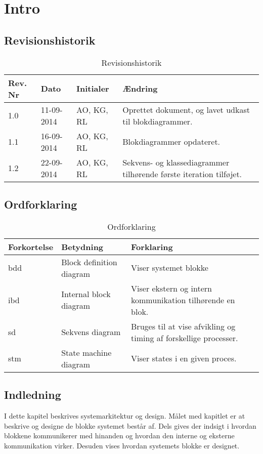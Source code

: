 \chapter{Intro}

\section{Revisionshistorik}
\begin{table}[H]
	\centering
		\begin{tabular}{|p{2 cm}|p{2 cm}|p{3 cm}|p{6 cm}|} 
		\hline
			\textbf{Rev. Nr} & \textbf{Dato}		& \textbf{Initialer} 	& \textbf{Ændring} \\ \hline
			1.0 	& 11-09-2014 & AO, KG, RL  & Oprettet dokument, og lavet udkast til blokdiagrammer.  \\ \hline
			1.1 	& 16-09-2014 & AO, KG, RL  & Blokdiagrammer opdateret. 	\\ \hline
			1.2 	& 22-09-2014 & AO, KG, RL  & Sekvens- og klassediagrammer \newline tilhørende første iteration tilføjet.	\\ \hline
		\end{tabular}
	\caption{Revisionshistorik}
\end{table}

\vspace{1.5cm}

\section{Ordforklaring}
\begin{table}[H]
	\centering
		\begin{tabular}{|p{2.5cm}|p{4.5 cm}|p{6.5 cm}|} 
		\hline
			\textbf{Forkortelse} & \textbf{Betydning} & \textbf{Forklaring} \\ \hline
			 bdd& Block definition diagram  & Viser systemet blokke  \\ \hline
			 ibd& Internal block diagram & Viser ekstern og intern kommunikation tilhørende en blok. \\ \hline
			 sd& Sekvens diagram & Bruges til at vise afvikling og timing af forskellige processer. \\ \hline
			 stm& State machine diagram & Viser states i en given proces. \\ \hline
		\end{tabular}
	\caption{Ordforklaring}
\end{table}

\vspace{1cm}

\section{Indledning}
I dette kapitel beskrives systemarkitektur og design. Målet med kapitlet er at beskrive og designe de blokke systemet består af. Dels gives der indsigt i hvordan blokkene kommunikerer med hinanden og hvordan den interne og eksterne kommunikation virker. Desuden vises hvordan systemets blokke er designet. 